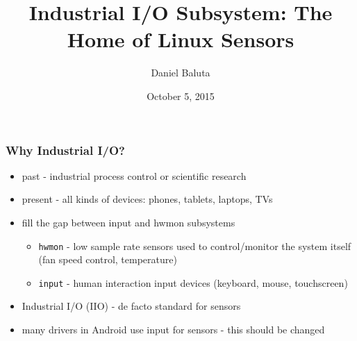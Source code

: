 \documentclass[aspectratio=169]{beamer}
\title[Industrial I/O]{Industrial I/O Subsystem: The Home of Linux Sensors} %
\author{Daniel Baluta} %
\institute[Intel] %
{
Intel \\ %
\medskip
\textit{daniel.baluta@intel.com} %
}
\date{October 5, 2015} %
\begin{document}
\begin{frame}
\titlepage %
\end{frame}






\begin{frame}
\frametitle{Why Industrial I/O?}
\begin{itemize}
\item past - industrial process control or scientific research
\item present - all kinds of devices: phones, tablets, laptops, TVs
\item fill the gap between input and hwmon subsystems
    \begin{itemize}
    \item \texttt{hwmon} - low sample rate sensors used to control/monitor the system itself (fan speed control, temperature)
        \item \texttt{input} - human interaction input devices (keyboard, mouse, touchscreen)
    \end{itemize}
    \item Industrial I/O (IIO) - de facto standard for sensors
    \item many drivers in Android use input for sensors - this should be changed
\end{itemize}
\end{frame}
\end{document}

